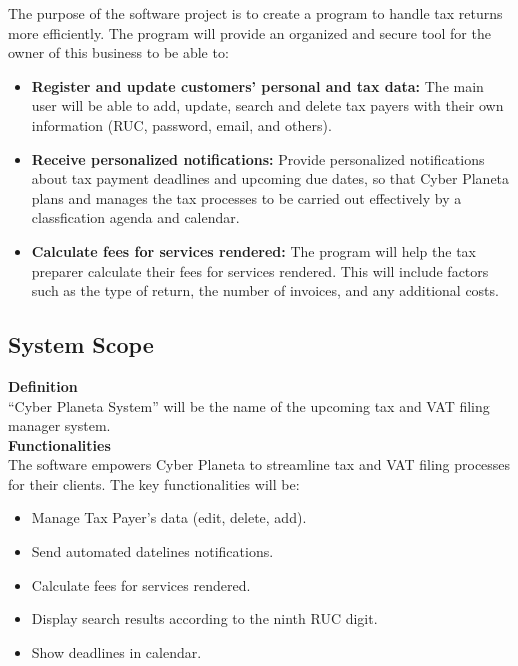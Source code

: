 \documentclass[12pt,a4paper, twosite]{article}
\begin{document}
The purpose of the software project is to create a program to handle tax returns more efficiently. The program will provide an organized and secure tool for the owner of this business to be able to:
\begin{itemize}
\item \textbf{Register and update customers' personal and tax data:}  The main user will be able to add, update, search and delete tax payers with their own information (RUC, password, email, and others).

\item \textbf{Receive personalized notifications:} Provide personalized notifications about tax payment deadlines and upcoming due dates, so that Cyber Planeta plans and manages the tax processes to be carried out effectively by a classfication agenda and calendar.

\item \textbf{Calculate fees for services rendered:} 
The program will help the tax preparer calculate their fees for services rendered. This will include factors such as the type of return, the number of invoices, and any additional costs.

\end{itemize}


\subsection{System Scope}
\label{sec:org12e44a1}

 \textbf{Definition }
 \\“Cyber Planeta System” will be the name of the upcoming tax and VAT filing manager system. \\

\textbf{Functionalities }
\\The software empowers Cyber Planeta to streamline tax and VAT filing processes for their clients. The key functionalities will be:
\begin{itemize}
    \item Manage Tax Payer's data (edit, delete, add).
    \item Send automated datelines notifications.
    \item Calculate fees for services rendered.
    \item Display search results according to the ninth RUC digit.
    \item Show deadlines in calendar.
\end{itemize}
\end{document}
